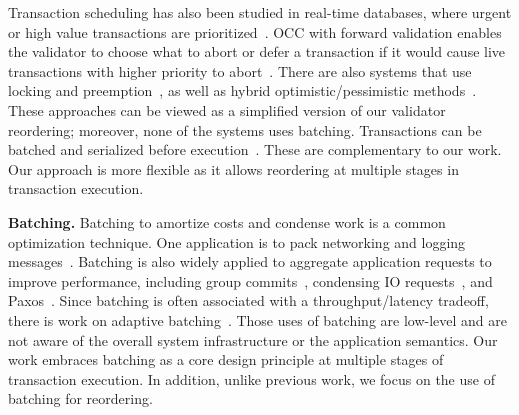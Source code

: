 Transaction scheduling has also been studied in real-time databases, where urgent or high value transactions are prioritized~\cite{haritsa1993value}.
OCC with forward validation enables the validator to choose what to abort or defer a transaction if it would cause live transactions with higher priority to abort~\cite{haritsa1990dynamic, lam1995real,lee1993using}. There are also systems that use locking and preemption~\cite{abbott1992scheduling}, as well as hybrid optimistic/pessimistic methods~\cite{huang1991experimental, lin1990concurrency}. These approaches can be viewed as a simplified version of our validator reordering; moreover, none of the systems uses batching. 
Transactions can be batched and serialized before execution~\cite{thomson2012calvin, mu2014extracting, faleiro2014rethinking}. These are complementary to our work. Our approach is more flexible as it allows reordering at multiple stages in transaction execution.

{\bf Batching.}
Batching to amortize costs and condense work is a common optimization technique. One application is to pack networking and logging messages~\cite{castro2002practical,ding2015centiman,friedman1997packing,glendenning2011scalable}. Batching is also widely applied to aggregate application requests to improve performance, including group commits~\cite{debrabant2013anti,hagmann1987reimplementing}, condensing IO requests~\cite{debrabant2013anti, faleiro2014lazy}, and Paxos~\cite{santos2012tuning}.
Since batching is often associated with a throughput/latency tradeoff, there is work on adaptive batching~\cite{friedman2006adaptive, nagle1984congestion}.
Those uses of batching are low-level and are not aware of the overall system infrastructure or the application semantics. Our work embraces batching as a core design principle at multiple stages of transaction execution. In addition, unlike previous work, we focus on the use of batching for reordering.

